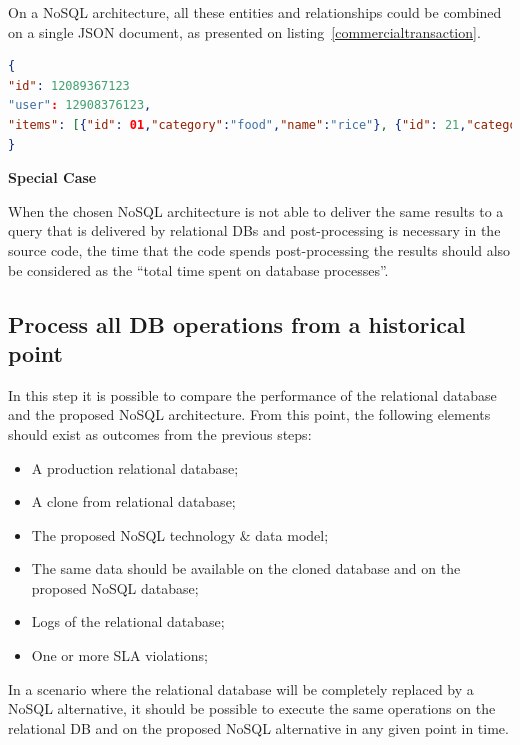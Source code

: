 On a NoSQL architecture, all these entities and relationships could be combined on a single JSON document, as presented on listing~\ref{commercialtransaction}. 

\begin{lstlisting}[language=json,firstnumber=1, caption=BI application commercial transaction represented as a single document., label=commercialtransaction]
{
"id": 12089367123
"user": 12908376123,
"items": [{"id": 01,"category":"food","name":"rice"}, {"id": 21,"category":"drinks","name":"soda"}]
}
\end{lstlisting}

\noindent \textbf{Special Case}

When the chosen NoSQL architecture is not able to deliver the same results to a query that is delivered by relational DBs and post-processing is necessary in the source code, the time that the code spends post-processing the results should also be considered as the ``total time spent on database processes''. 




\subsection{Process all DB operations from a historical point}

In this step it is possible to compare the performance of the relational database and the proposed NoSQL architecture. From this point, the following elements should exist as outcomes from the previous steps: 

\begin{itemize}
\item{A production relational database;}
\item{A clone from relational database;}
\item{The proposed NoSQL technology \& data model;}
\item{The same data should be available on the cloned database and on the proposed NoSQL database;}
\item{Logs of the relational database;}
\item{One or more SLA violations;}
\end{itemize}

In a scenario where the relational database will be completely replaced by a NoSQL alternative, it should be possible to execute the same operations on the relational DB and on the proposed NoSQL alternative in any given point in time.

